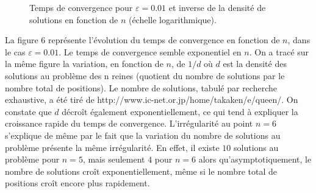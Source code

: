 \documentclass[11pt, openany]{article}
\begin{document}
\begin{figure}
  \centering

  \caption{Temps de convergence pour $\varepsilon=0.01$ et inverse de la densité de solutions en fonction de $n$  (échelle logarithmique).}
\end{figure}   

La figure $6$ représente l'évolution du temps de convergence en fonction de $n$, dans le cas $\varepsilon=0.01$. Le temps de convergence semble exponentiel en $n$. On a tracé sur la même figure la variation, en fonction de $n$, de $1/d$ où $d$ est la densité des solutions au problème des n reines (quotient du nombre de solutions par le nombre total de positions). Le nombre de solutions, tabulé par recherche exhaustive, a été tiré de http://www.ic-net.or.jp/home/takaken/e/queen/. On constate que $d$ décroît également exponentiellement, ce qui tend à expliquer la croissance rapide du temps de convergence. L'irrégularité au point $n=6$ s'explique de même par le fait que la variation du nombre de solutions au problème présente la même irrégularité. En effet, il existe $10$ solutions au problème pour $n=5$, mais seulement $4$ pour $n=6$ alors qu'asymptotiquement, le nombre de solutions croît exponentiellement, même si le nombre total de positions croît encore plus rapidement.
\end{document}

